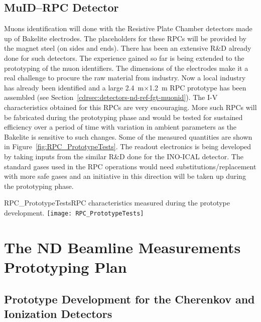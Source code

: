 \subsection{MuID--RPC Detector}   


Muons identification will done with the Resistive Plate Chamber
detectors made up of Bakelite electrodes.  The placeholders for these
RPCs will be provided by the magnet steel (on sides and ends). There
has been an extensive R\&D already done for such detectors. The
experience gained so far is being extended to the prototyping of the
muon identifiers. The dimensions of the electrodes make it a real
challenge to procure the raw material from industry. Now a local
industry has already been identified and a large 2.4~m$\times$1.2~m
RPC prototype has been assembled (see
Section~\ref{cdrsec:detectors-nd-ref-fgt-muonid}). The I-V
characteristics obtained for this RPCs are very encouraging. More such
RPCs will be fabricated during the prototyping phase and would be
tested for sustained efficiency over a period of time with variation
in ambient parameters as the Bakelite is sensitive to such
changes. Some of the measured quantities are shown in
Figure~\ref{fig:RPC_PrototypeTests}.  The readout electronics is being
developed by taking inputs from the similar R\&D done for the INO-ICAL
detector. The standard gases used in the RPC operations would need
substitutions/replacement with more safe gases and an initiative in
this direction will be taken up during the prototyping phase.
\begin{cdrfigure}  
{RPC_PrototypeTests}{RPC characteristics measured during the prototype development.}  
\texttt{[image: RPC\_PrototypeTests]}
\end{cdrfigure}



\section{The ND Beamline Measurements Prototyping Plan} 
\label{sec:proto-nd-blm}

\subsection{Prototype Development for the Cherenkov and Ionization Detectors}
\label{subsec:proto-blm-muon-cherenkov-proto}

